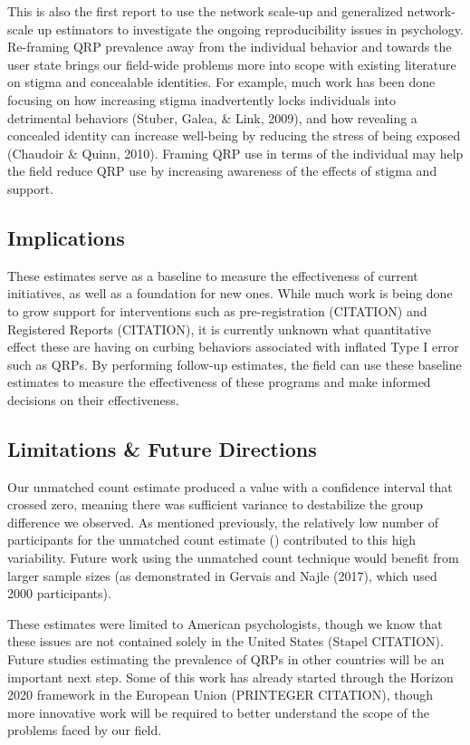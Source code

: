 \documentclass[,jou]{apa6}
\theoremstyle{definition}
\theoremstyle{definition}
\theoremstyle{definition}
\theoremstyle{remark}
\begin{document}
This is also the first report to use the network scale-up and
generalized network-scale up estimators to investigate the ongoing
reproducibility issues in psychology. Re-framing QRP prevalence away
from the individual behavior and towards the user state brings our
field-wide problems more into scope with existing literature on stigma
and concealable identities. For example, much work has been done
focusing on how increasing stigma inadvertently locks individuals into
detrimental behaviors (Stuber, Galea, \& Link, 2009), and how revealing
a concealed identity can increase well-being by reducing the stress of
being exposed (Chaudoir \& Quinn, 2010). Framing QRP use in terms of the
individual may help the field reduce QRP use by increasing awareness of
the effects of stigma and support.

\subsection{Implications}\label{implications}

These estimates serve as a baseline to measure the effectiveness of
current initiatives, as well as a foundation for new ones. While much
work is being done to grow support for interventions such as
pre-registration (CITATION) and Registered Reports (CITATION), it is
currently unknown what quantitative effect these are having on curbing
behaviors associated with inflated Type I error such as QRPs. By
performing follow-up estimates, the field can use these baseline
estimates to measure the effectiveness of these programs and make
informed decisions on their effectiveness.

\subsection{Limitations \& Future
Directions}\label{limitations-future-directions}

Our unmatched count estimate produced a value with a confidence interval
that crossed zero, meaning there was sufficient variance to destabilize
the group difference we observed. As mentioned previously, the
relatively low number of participants for the unmatched count estimate
() contributed to this high variability. Future work using the unmatched
count technique would benefit from larger sample sizes (as demonstrated
in Gervais and Najle (2017), which used 2000 participants).

These estimates were limited to American psychologists, though we know
that these issues are not contained solely in the United States (Stapel
CITATION). Future studies estimating the prevalence of QRPs in other
countries will be an important next step. Some of this work has already
started through the Horizon 2020 framework in the European Union
(PRINTEGER CITATION), though more innovative work will be required to
better understand the scope of the problems faced by our field.
\end{document}
